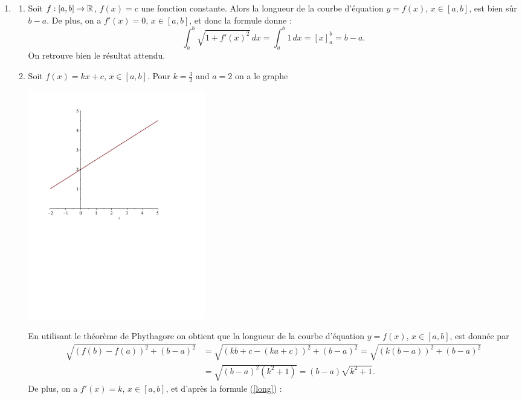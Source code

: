 \documentclass[11pt,class=report,crop=false]{standalone}
\begin{document}
\sauteligne
\begin{enumerate} 
	\item 
	\begin{enumerate} 
		\item 
		Soit $ f: [a, b] \rightarrow \mathbb{R} $, $ f(x) = c $ une fonction constante. 
		Alors la longueur de la courbe d'équation $ y = f(x) $, $ x \in [a, b] $, 
		est bien sûr $ b - a $. De plus, on a $ f'(x) = 0 $, $ x \in [a, b] $, et donc la formule donne :
		\begin{equation*} 
			\int_{a}^{b} \sqrt{1+f'(x)^{2}}\,dx = \int_a^b 1 \, dx = \left[x\right]_a^b 
			= b - a. 
		\end{equation*} 
		On retrouve bien le résultat attendu. 
		\item 
		Soit $ f(x) = kx + c $, $ x \in [a, b] $. Pour $ k = \frac{3}{2} $ and 
		$ a = 2 $ on a le graphe 
		\begin{center} 
			\includegraphics[height=10cm]{figures/plot4} 
		\end{center} 
		En utilisant le théorème de Phythagore on obtient que la longueur de 
		la courbe d'équation $ y = f(x) $, $ x \in [a, b] $, est donnée par 
		\begin{equation*} 
			\begin{split} 
				\sqrt{(f(b) - f(a))^2 + (b-a)^2} 
				&= \sqrt{(kb + c - (ka + c))^2 + (b-a)^2} 
				= \sqrt{(k(b-a))^2 + (b-a)^2} \\ 
				&= \sqrt{(b-a)^2 (k^2 + 1)} 
				= (b-a) \sqrt{k^2 + 1}. 
			\end{split} 
		\end{equation*} 
		De plus, on a $ f'(x) = k $, $ x \in [a, b] $, et d'après la formule (\ref{long}) :

\end{enumerate}
\end{enumerate}
\end{document}
